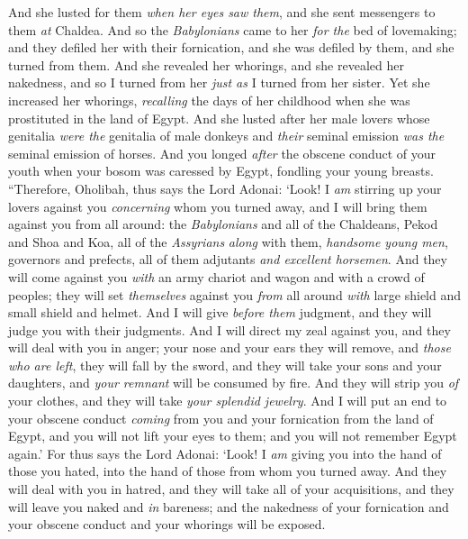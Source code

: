 \begin{biblechapter}
\verse And she lusted for them \textit{when her eyes saw them}, and she sent messengers to them \textit{at} Chaldea.
\verse And so the \textit{Babylonians} came to her \textit{for the} bed of lovemaking; and they defiled her with their fornication, and she was defiled by them, and she turned from them.
\verse And she revealed her whorings, and she revealed her nakedness, and so I turned from her \textit{just as} I turned from her sister.
\verse Yet she increased her whorings, \textit{recalling} the days of her childhood when she was prostituted in the land of Egypt.
\verse And she lusted after her male lovers whose genitalia \textit{were the} genitalia of male donkeys and \textit{their} seminal emission \textit{was the} seminal emission of horses.
\verse And you longed \textit{after} the obscene conduct of your youth when your bosom was caressed by Egypt, fondling your young breasts.
\verse “Therefore, Oholibah, thus says the Lord Adonai: ‘Look! I \textit{am} stirring up your lovers against you \textit{concerning} whom you turned away, and I will bring them against you from all around:
\verse the \textit{Babylonians} and all of the Chaldeans, Pekod and Shoa and Koa, all of the \textit{Assyrians} \textit{along} with them, \textit{handsome young men}, governors and prefects, all of them adjutants \textit{and excellent horsemen}.
\verse And they will come against you \textit{with} an army chariot and wagon and with a crowd of peoples; they will set \textit{themselves} against you \textit{from} all around \textit{with} large shield and small shield and helmet. And I will give \textit{before them} judgment, and they will judge you with their judgments.
\verse And I will direct my zeal against you, and they will deal with you in anger; your nose and your ears they will remove, and \textit{those who are left}, they will fall by the sword, and they will take your sons and your daughters, and \textit{your remnant} will be consumed by fire.
\verse And they will strip you \textit{of} your clothes, and they will take \textit{your splendid jewelry}.
\verse And I will put an end to your obscene conduct \textit{coming} from you and your fornication from the land of Egypt, and you will not lift your eyes to them; and you will not remember Egypt again.’
\verse For thus says the Lord Adonai: ‘Look! I \textit{am} giving you into the hand of those you hated, into the hand of those from whom you turned away.
\verse And they will deal with you in hatred, and they will take all of your acquisitions, and they will leave you naked and \textit{in} bareness; and the nakedness of your fornication and your obscene conduct and your whorings will be exposed.

\end{biblechapter}

